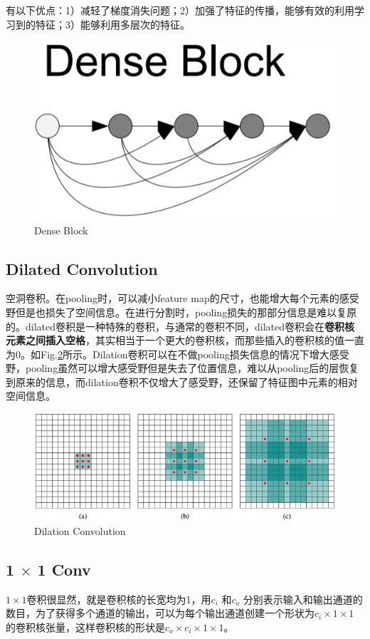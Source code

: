 有以下优点：1）减轻了梯度消失问题；2）加强了特征的传播，能够有效的利用学习到的特征；3）能够利用多层次的特征。
\begin{figure}[h]
	\centering
	\includegraphics[width=.4\textwidth]{pics/dense block.png}
	\caption{Dense Block}
	\label{fig:dense block}
\end{figure}

\subsection{Dilated Convolution}空洞卷积。在pooling时，可以减小feature map的尺寸，也能增大每个元素的感受野但是也损失了空间信息。在进行分割时，pooling损失的那部分信息是难以复原的。dilated卷积是一种特殊的卷积，与通常的卷积不同，dilated卷积会在\textbf{卷积核元素之间插入空格}，其实相当于一个更大的卷积核，而那些插入的卷积核的值一直为0。如Fig.\ref{fig:dilation}所示。Dilation卷积可以在不做pooling损失信息的情况下增大感受野，pooling虽然可以增大感受野但是失去了位置信息，难以从pooling后的层恢复到原来的信息，而dilation卷积不仅增大了感受野，还保留了特征图中元素的相对空间信息。
\begin{figure}[h]
	\centering
	\includegraphics[width=.8\textwidth]{pics/dilation.jpg}
	\caption{Dilation Convolution}
	\label{fig:dilation}
\end{figure}

\subsection{1 $\times$ 1 Conv}
$1\times 1$卷积很显然，就是卷积核的长宽均为1，用$c_i$ 和$c_o$  分别表示输入和输出通道的数目，为了获得多个通道的输出，可以为每个输出通道创建一个形状为$c_i\times 1 \times 1$ 的卷积核张量，这样卷积核的形状是$c_o \times c_i \times 1 \times 1$。

